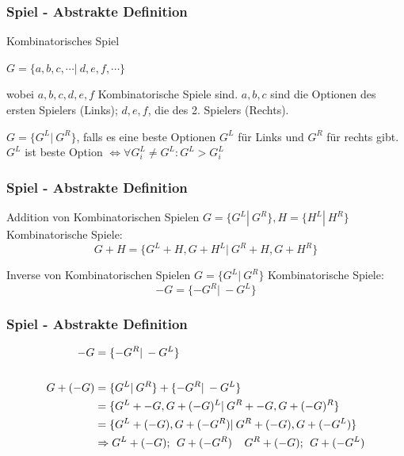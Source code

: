 \documentclass[12pt, aspectratio=169]{beamer}
\begin{document}
\begin{frame}
    \frametitle{Spiel - Abstrakte Definition}

    \begin{block}{Kombinatorisches Spiel}
        \begin{center}
            $G = \{ a,b,c,\cdots | \: d,e,f,\cdots\}$
        \end{center}
        wobei $a,b,c,d,e,f$ Kombinatorische Spiele sind. $a,b,c$ sind die Optionen des ersten Spielers (Links);
        $d,e,f$, die des 2. Spielers (Rechts). 
    \end{block}
    $G = \{G^L | \: G^R\}$, falls es eine beste Optionen $G^L$ für Links und $G^R$ für rechts gibt. \\
    $G^L$ ist beste Option $\iff \forall G^L_i \neq G^L: G^L > G^L_i$
\end{frame}

\begin{frame}
    \frametitle{Spiel - Abstrakte Definition}

    \begin{block}{Addition von Kombinatorischen Spielen}
        $G = \{G^L| \: G^R\}, H = \{H^L | \: H^R\}$ Kombinatorische Spiele$: $
        \[ G+H = \{G^L + H, G + H^L | \: G^R + H, G + H^R\} \]
    \end{block}

    \begin{block}{Inverse von Kombinatorischen Spielen}
        $G = \{G^L| \: G^R\}$ Kombinatorische Spiele:
        \[ -G = \{-G^R |\: -G^L \}\]

    \end{block}

\end{frame}

\begin{frame}
    \frametitle{Spiel - Abstrakte Definition}

    \begin{align*}
        -G &= \{-G^R |\: -G^L \} \\
        \vspace*{100px}\\
        G + (-G) &= \{G^L| \: G^R\} + \{-G^R |\: -G^L \} \\
        &= \{G^L + -G, G + (-G)^L |\: G^R + -G, G + (-G)^R \} \\
        &= \{G^L + (-G), G + (-G^R) |\: G^R + (-G), G + (-G^L) \} \\
        &\Rightarrow G^L + (-G); \:\: G + (-G^R) \:\:\:\:\: G^R + (-G); \:\: G + (-G^L)
    \end{align*}
\end{frame}
\end{document}
